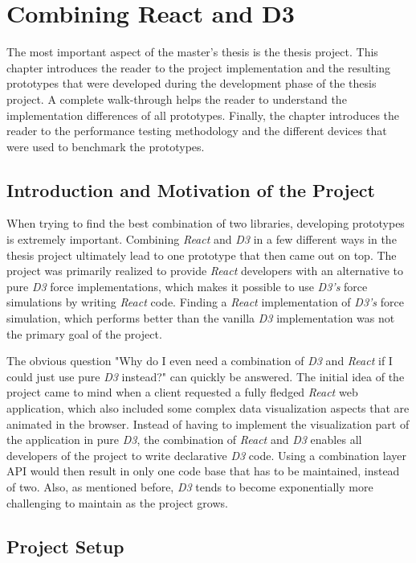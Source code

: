 \chapter{Combining React and D3}
\label{cha:visualization}

The most important aspect of the master's thesis is the thesis project. This chapter introduces the reader to the project implementation and the resulting prototypes that were developed during the development phase of the thesis project. A complete walk-through helps the reader to understand the implementation differences of all prototypes. Finally, the chapter introduces the reader to the performance testing methodology and the different devices that were used to benchmark the prototypes.

\section{Introduction and Motivation of the Project}

When trying to find the best combination of two libraries, developing prototypes is extremely important. Combining \emph{React} and \emph{D3} in a few different ways in the thesis project ultimately lead to one prototype that then came out on top. The project was primarily realized to provide \emph{React} developers with an alternative to pure \emph{D3} force implementations, which makes it possible to use \emph{D3's} force simulations by writing \emph{React} code. Finding a \emph{React} implementation of \emph{D3's} force simulation, which performs better than the vanilla \emph{D3} implementation was not the primary goal of the project.

The obvious question "Why do I even need a combination of \emph{D3} and \emph{React} if I could just use pure \emph{D3} instead?" can quickly be answered. The initial idea of the project came to mind when a client requested a fully fledged \emph{React} web application, which also included some complex data visualization aspects that are animated in the browser. Instead of having to implement the visualization part of the application in pure \emph{D3}, the combination of \emph{React} and \emph{D3} enables all developers of the project to write declarative \emph{D3} code. Using a combination layer API would then result in only one code base that has to be maintained, instead of two. Also, as mentioned before, \emph{D3} tends to become exponentially more challenging to maintain as the project grows.

\section{Project Setup}
\label{sub:projectSetup}

